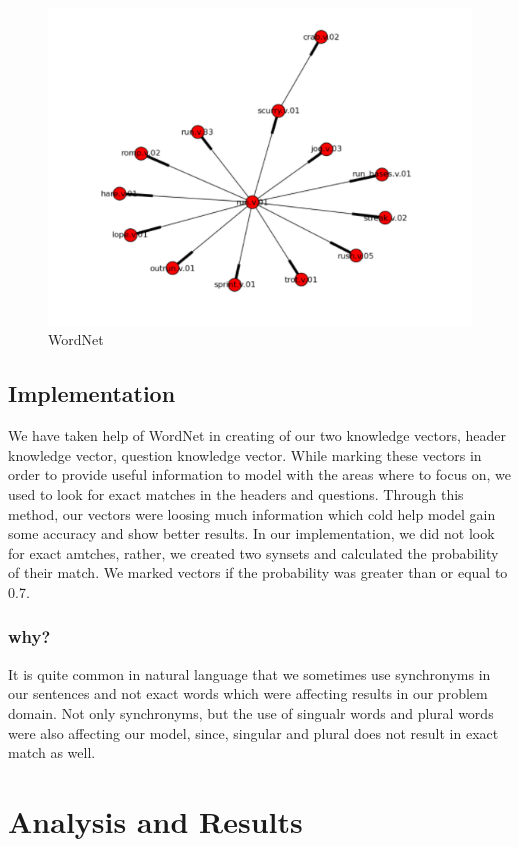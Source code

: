 \documentclass[12pt]{article}
\begin{document}
\begin{figure}[H]
    \includegraphics[width=400pt]{wordnet}
    \caption{WordNet}
    \label{wordnet}
\end{figure}

\subsection{Implementation}
We have taken help of WordNet in creating of our two knowledge vectors, header knowledge vector, question knowledge vector. While marking these vectors in order to provide useful information to model with the areas where to focus on, we used to look for exact matches in the headers and questions. Through this method, our vectors were loosing much information which cold help model gain some accuracy and show better results. In our implementation, we did not look for exact amtches, rather, we created two synsets and calculated the probability of their match. We marked vectors if the probability was greater than or equal to 0.7. 

\subsubsection{why?}
It is quite common in natural language that we sometimes use synchronyms in our sentences and not exact words which were affecting results in our problem domain. Not only synchronyms, but the use of singualr words and plural words were also affecting our model, since, singular and plural does not result in exact match as well. 

\section{Analysis and Results}
\end{document}
